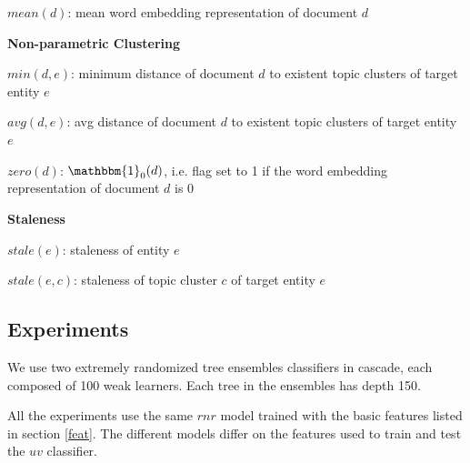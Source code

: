 \documentclass{article}
\begin{document}
\begin{itemize*}
    \begin{itemize*}
        \item $mean(d)$: mean word embedding representation of document $d$
    \end{itemize*}
  \item \textbf{Non-parametric Clustering}
    \begin{itemize*}
        \item $min(d,e)$: minimum distance of document $d$ to existent topic clusters of target entity $e$
        \item $avg(d,e)$: avg distance of document $d$ to existent topic clusters of target entity $e$
        \item $zero(d)$: $\mathbbm{1}_{0}{(d)}$, i.e. flag set to 1 if the word embedding representation of document $d$ is $0$
    \end{itemize*}
  \item \textbf{Staleness}
    \begin{itemize*}
        \item $stale(e)$: staleness of entity $e$
        \item $stale(e,c)$: staleness of topic cluster $c$ of target entity $e$
    \end{itemize*}
\end{itemize*}


\subsection{Experiments}
\label{expe}

We use two extremely randomized tree ensembles classifiers \cite{GEW06a} in cascade, each composed of 100 weak learners. Each tree in the ensembles has depth 150.

All the experiments use the same $rnr$ model trained with the basic features listed in section \ref{feat}. 
The different models differ on the features used to train and test the $uv$ classifier.
\end{document}
